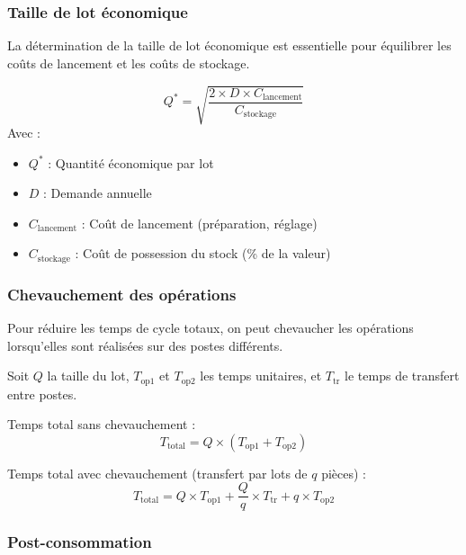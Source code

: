 \documentclass{article}
\begin{document}
\subsubsection{Taille de lot économique}

La détermination de la taille de lot économique est essentielle pour équilibrer les coûts de lancement et les coûts de stockage.

\begin{tcolorbox}[colback=blue!5!white, colframe=blue!75!black, title=Formule de Wilson (lot économique)]
\[
Q^* = \sqrt{\frac{2 \times D \times C_{\text{lancement}}}{C_{\text{stockage}}}}
\]
Avec :
\begin{itemize}
    \item $Q^*$ : Quantité économique par lot
    \item $D$ : Demande annuelle
    \item $C_{\text{lancement}}$ : Coût de lancement (préparation, réglage)
    \item $C_{\text{stockage}}$ : Coût de possession du stock (\% de la valeur)
\end{itemize}
\end{tcolorbox}

\subsubsection{Chevauchement des opérations}

Pour réduire les temps de cycle totaux, on peut chevaucher les opérations lorsqu'elles sont réalisées sur des postes différents.

\begin{tcolorbox}[colback=gray!5!white, colframe=gray!75!black, title=Principe du chevauchement]
Soit $Q$ la taille du lot, $T_{\text{op1}}$ et $T_{\text{op2}}$ les temps unitaires, et $T_{\text{tr}}$ le temps de transfert entre postes.

Temps total sans chevauchement :
\[
T_{\text{total}} = Q \times (T_{\text{op1}} + T_{\text{op2}})
\]

Temps total avec chevauchement (transfert par lots de $q$ pièces) :
\[
T_{\text{total}} = Q \times T_{\text{op1}} + \frac{Q}{q} \times T_{\text{tr}} + q \times T_{\text{op2}}
\]
\end{tcolorbox}

\subsubsection{Post-consommation}
\end{document}
